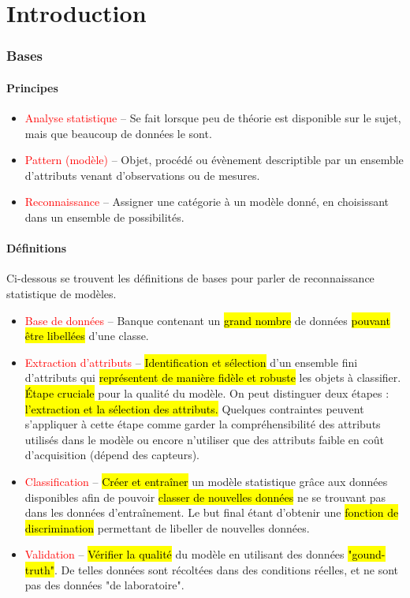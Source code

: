 \documentclass[letterpaper, 12pt]{article}
\newcommand{\alinea}{
\hspace*{0.5cm}}
\newcommand{\red}[1]{
	\textcolor{red}{#1}}
\begin{document}
\part{Introduction}
	\section{Bases}
		\subsection{Principes}
			\begin{itemize}
				\setlength\itemsep{0cm}
				\item \red{Analyse statistique} -- Se fait lorsque peu de théorie est disponible sur le sujet, mais que beaucoup de 
					données le sont.
				\item \red{Pattern (modèle)} -- Objet, procédé ou évènement descriptible par un ensemble d'attributs
					venant d'observations ou de mesures.
				\item \red{Reconnaissance} -- Assigner une catégorie à un modèle donné, en choisissant dans un ensemble de possibilités.
			\end{itemize}
		\subsection{Définitions}
			\alinea Ci-dessous se trouvent les définitions de bases pour parler de reconnaissance statistique de modèles.
			\begin{itemize}
				\setlength\itemsep{0cm}
				\item \red{Base de données} -- Banque contenant un \hl{grand nombre} de données \hl{pouvant être libellées} d'une classe.
				\item \red{Extraction d'attributs} -- \hl{Identification et sélection} d'un ensemble fini d'attributs qui 
					\hl{représentent de manière fidèle et robuste} les objets à classifier. \hl{\'Etape cruciale} pour la qualité
					du modèle. On peut distinguer deux étapes : \hl{l'extraction et la sélection des attributs.}
					Quelques contraintes peuvent s'appliquer à cette étape comme garder la compréhensibilité des attributs utilisés
					dans le modèle ou encore n'utiliser que des attributs faible en coût d'acquisition (dépend des capteurs).
				\item \red{Classification} -- \hl{Créer et entraîner} un modèle statistique grâce aux données disponibles afin de pouvoir
					\hl{classer de nouvelles données} ne se trouvant pas dans les données d'entraînement.
					Le but final étant d'obtenir une \hl{fonction de discrimination} permettant de libeller de nouvelles données.
				\item \red{Validation} -- \hl{Vérifier la qualité} du modèle en utilisant des données \hl{"gound-truth"}. De telles 
					données sont récoltées dans des conditions réelles, et ne sont pas des données "de laboratoire".
			\end{itemize}
\end{document}

